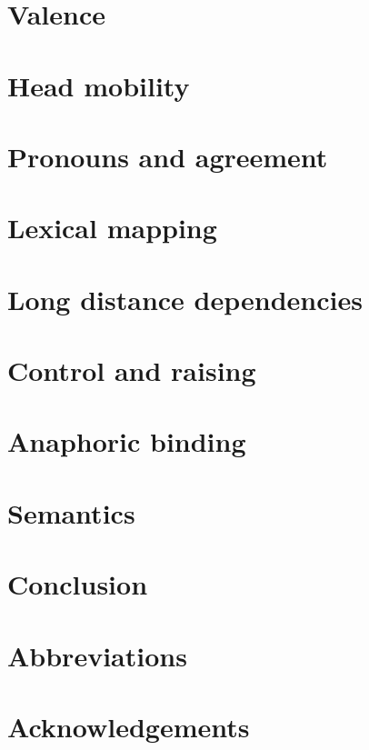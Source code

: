 \documentclass[output=paper]{langsci/langscibook}
\begin{document}
\section{Valence} 

\section{Head mobility} 

\section{Pronouns and agreement} 

\section{Lexical mapping}

\section{Long distance dependencies}

\section{Control and raising}

\section{Anaphoric binding}

\section{Semantics}

\section{Conclusion}

 
\section*{Abbreviations}
\section*{Acknowledgements}

\printbibliography[heading=subbibliography,notkeyword=this] 
\end{document}
